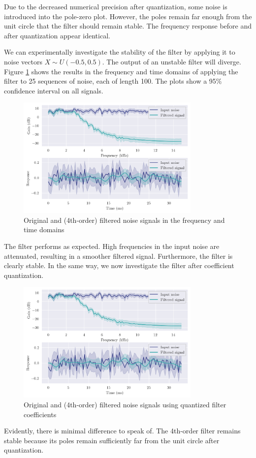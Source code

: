 Due to the decreased numerical precision after quantization, some noise is introduced into the pole-zero plot. However, the poles remain far enough from the unit circle that the filter should remain stable. The frequency response before and after quantization appear identical.

\newpage

We can experimentally investigate the stability of the filter by applying it to noise vectors $X\sim U(-0.5, 0.5)$. The output of an unstable filter will diverge. Figure \ref{fig:q7_4th_stability} shows the results in the frequency and time domains of applying the filter to 25 sequences of noise, each of length 100. The plots show a 95\% confidence interval on all signals.

\begin{figure}[ht]
    \centering
    \includegraphics[width=0.8\textwidth]{images/q7_4th_stability.png}
    \caption{Original and (4th-order) filtered noise signals in the frequency and time domains}
    \label{fig:q7_4th_stability}
\end{figure}

The filter performs as expected. High frequencies in the input noise are attenuated, resulting in a smoother filtered signal. Furthermore, the filter is clearly stable. In the same way, we now investigate the filter after coefficient quantization.

\begin{figure}[!ht]
    \centering
    \includegraphics[width=0.8\textwidth]{images/q7_q4th_stability.png}
    \caption{Original and (4th-order) filtered noise signals using quantized filter coefficients}
    \label{fig:q7_q4th_stability}
\end{figure}

Evidently, there is minimal difference to speak of. The 4th-order filter remains stable because its poles remain sufficiently far from the unit circle after quantization.
